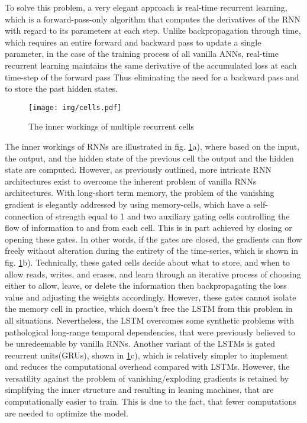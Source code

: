			To solve this problem, a very elegant approach is real-time recurrent learning, which is a forward-pass-only algorithm that computes the derivatives of the RNN with regard to its parameters at each step. Unlike backpropagation through time, which requires an entire forward and backward pass to update a single parameter, in the case of the training process of all vanilla ANNs, real-time recurrent learning maintains the same derivative of the accumulated loss at each time-step of the forward pass Thus eliminating the need for a backward pass and to store the past hidden states\cite{hochreiter1997long}.
			\begin{figure}[H]
				\begin{center}
					\texttt{[image: img/cells.pdf]}
					\caption{The inner workings of multiple recurrent cells}
					\label{fig:cells}
				\end{center}
			\end{figure}
			The inner workings of RNNs are illustrated in fig. \ref{fig:cells}a), where based on the input, the output, and the hidden state of the previous cell the output and the hidden state are computed. However, as previously outlined, more intricate RNN architectures exist to overcome the inherent problem of vanilla RNNs architectures. With long-short term memory, the problem of the vanishing gradient is elegantly addressed by using memory-cells, which have a self-connection of strength equal to 1 and two auxiliary gating cells controlling the flow of information to and from each cell. This is in part achieved by closing or opening these gates. In other words, if the gates are closed, the gradients can flow freely without alteration during the entirety of the time-series, which is shown in fig. \ref{fig:cells}b). Technically, these gated cells decide about what to store, and when to allow reads, writes, and erases, and learn through an iterative process of choosing either to allow, leave, or delete the information then backpropagating the loss value and adjusting the weights accordingly\cite{kumar2018energy}. However, these gates cannot isolate the memory cell in practice, which doesn't free the LSTM from this problem in all situations. Nevertheless, the LSTM overcomes some synthetic problems with pathological long-range temporal dependencies, that were previously believed to be unredeemable by vanilla RNNs\cite{sutskever2013training}.\newline
			Another variant of the LSTMs is gated recurrent units(GRUs), shown in \ref{fig:cells}c), which is relatively simpler to implement and reduces the computational overhead compared with LSTMs. However, the versatility against the problem of vanishing/exploding gradients is retained by simplifying the inner structure and resulting in leaning machines, that are computationally easier to train. This is due to the fact, that fewer computations are needed to optimize the model.\newline
